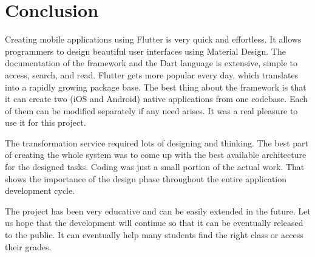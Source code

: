 \section{Conclusion}
Creating mobile applications using Flutter is very quick and effortless. It allows programmers to design beautiful user interfaces using Material Design. The documentation of the framework and the Dart language is extensive, simple to access, search, and read. Flutter gets more popular every day, which translates into a rapidly growing package base. The best thing about the framework is that it can create two (iOS and Android) native applications from one codebase. Each of them can be modified separately if any need arises. It was a real pleasure to use it for this project.

The transformation service required lots of designing and thinking. The best part of creating the whole system was to come up with the best available architecture for the designed tasks. Coding was just a small portion of the actual work. That shows the importance of the design phase throughout the entire application development cycle.

The project has been very educative and can be easily extended in the future. Let us hope that the development will continue so that it can be eventually released to the public. It can eventually help many students find the right class or access their grades.
